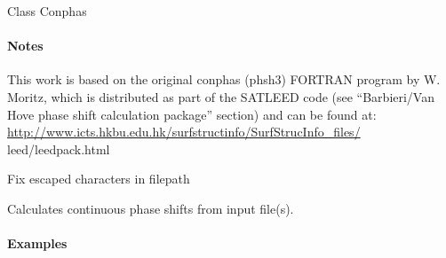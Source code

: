 \documentclass[letterpaper,10pt,english]{sphinxmanual}
\begin{document}
\begin{fulllineitems}
\label{modules:phaseshifts.conphas.Conphas}
Class Conphas
\paragraph{Notes}

This work is based on the original conphas (phsh3) FORTRAN program by 
W. Moritz, which is distributed as part of the SATLEED code (see 
``Barbieri/Van Hove phase shift calculation package'' section) and can be 
found at: \href{http://www.icts.hkbu.edu.hk/surfstructinfo/SurfStrucInfo\_files/}{http://www.icts.hkbu.edu.hk/surfstructinfo/SurfStrucInfo\_files/}
leed/leedpack.html

\begin{fulllineitems}
\label{modules:phaseshifts.conphas.Conphas._Conphas__fix_path}
Fix escaped characters in filepath

\end{fulllineitems}


\begin{fulllineitems}
\label{modules:phaseshifts.conphas.Conphas._Conphas__set_data}
\end{fulllineitems}


\begin{fulllineitems}
\label{modules:phaseshifts.conphas.Conphas.calculate}
Calculates continuous phase shifts from input file(s).
\paragraph{Examples}


\end{fulllineitems}
\end{fulllineitems}
\end{document}
